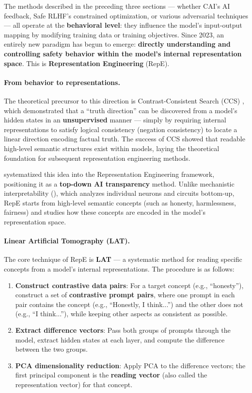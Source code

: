 The methods described in the preceding three sections --- whether CAI's AI feedback,
Safe RLHF's constrained optimization, or various adversarial techniques ---
all operate at the \textbf{behavioral level}:
they influence the model's input-output mapping by modifying training data or training objectives.
Since 2023, an entirely new paradigm has begun to emerge:
\textbf{directly understanding and controlling safety behavior within the model's internal representation space}.
This is \textbf{Representation Engineering} (RepE).

\paragraph{From behavior to representations.}
The theoretical precursor to this direction is Contrast-Consistent Search (CCS) \citep{burns2022ccs},
which demonstrated that a ``truth direction'' can be discovered from a model's hidden states
in an \textbf{unsupervised} manner --- simply by requiring internal representations to satisfy logical consistency (negation consistency)
to locate a linear direction encoding factual truth.
The success of CCS showed that readable high-level semantic structures exist within models,
laying the theoretical foundation for subsequent representation engineering methods.

 systematized this idea into the Representation Engineering framework,
positioning it as a \textbf{top-down AI transparency} method.
Unlike mechanistic interpretability (), which analyzes individual neurons and circuits bottom-up,
RepE starts from high-level semantic concepts (such as honesty, harmlessness, fairness)
and studies how these concepts are encoded in the model's representation space.

\paragraph{Linear Artificial Tomography (LAT).}
The core technique of RepE is \textbf{LAT} ---
a systematic method for reading specific concepts from a model's internal representations.
The procedure is as follows:

\begin{enumerate}[leftmargin=2em]
  \item \textbf{Construct contrastive data pairs}:
    For a target concept (e.g., ``honesty''), construct a set of \textbf{contrastive prompt pairs},
    where one prompt in each pair contains the concept (e.g., ``Honestly, I think...'')
    and the other does not (e.g., ``I think...''), while keeping other aspects as consistent as possible.

  \item \textbf{Extract difference vectors}:
    Pass both groups of prompts through the model, extract hidden states at each layer,
    and compute the difference between the two groups.

  \item \textbf{PCA dimensionality reduction}:
    Apply PCA to the difference vectors; the first principal component is the
    \textbf{reading vector} (also called the representation vector) for that concept.
\end{enumerate}

